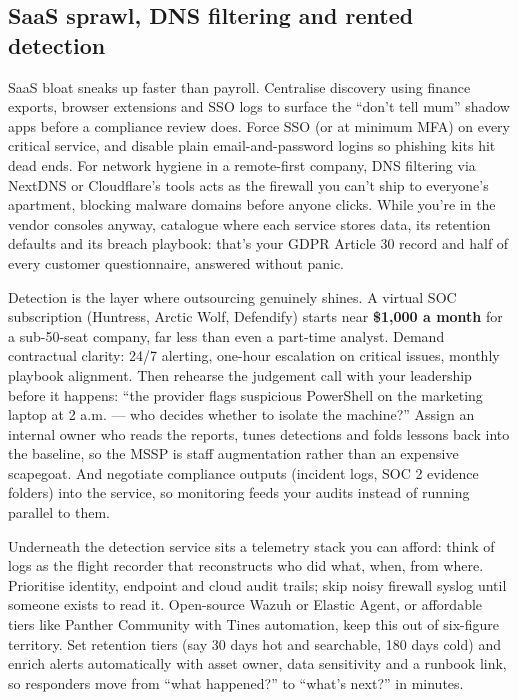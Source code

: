 \subsection{SaaS sprawl, DNS filtering and rented detection}


SaaS bloat sneaks up faster than payroll. Centralise discovery using finance exports, browser extensions and SSO logs to surface the ``don't tell mum'' shadow apps before a compliance review does. Force SSO (or at minimum MFA) on every critical service, and disable plain email-and-password logins so phishing kits hit dead ends. For network hygiene in a remote-first company, DNS filtering via NextDNS or Cloudflare's tools acts as the firewall you can't ship to everyone's apartment, blocking malware domains before anyone clicks. While you're in the vendor consoles anyway, catalogue where each service stores data, its retention defaults and its breach playbook: that's your GDPR Article 30 record and half of every customer questionnaire, answered without panic.


Detection is the layer where outsourcing genuinely shines. A virtual SOC subscription (Huntress, Arctic Wolf, Defendify) starts near \textbf{\$1,000 a month} for a sub-50-seat company, far less than even a part-time analyst. Demand contractual clarity: 24/7 alerting, one-hour escalation on critical issues, monthly playbook alignment. Then rehearse the judgement call with your leadership before it happens: ``the provider flags suspicious PowerShell on the marketing laptop at 2 a.m. — who decides whether to isolate the machine?'' Assign an internal owner who reads the reports, tunes detections and folds lessons back into the baseline, so the MSSP is staff augmentation rather than an expensive scapegoat. And negotiate compliance outputs (incident logs, SOC 2 evidence folders) into the service, so monitoring feeds your audits instead of running parallel to them.


Underneath the detection service sits a telemetry stack you can afford: think of logs as the flight recorder that reconstructs who did what, when, from where. Prioritise identity, endpoint and cloud audit trails; skip noisy firewall syslog until someone exists to read it. Open-source Wazuh or Elastic Agent, or affordable tiers like Panther Community with Tines automation, keep this out of six-figure territory. Set retention tiers (say 30 days hot and searchable, 180 days cold) and enrich alerts automatically with asset owner, data sensitivity and a runbook link, so responders move from ``what happened?'' to ``what's next?'' in minutes.



